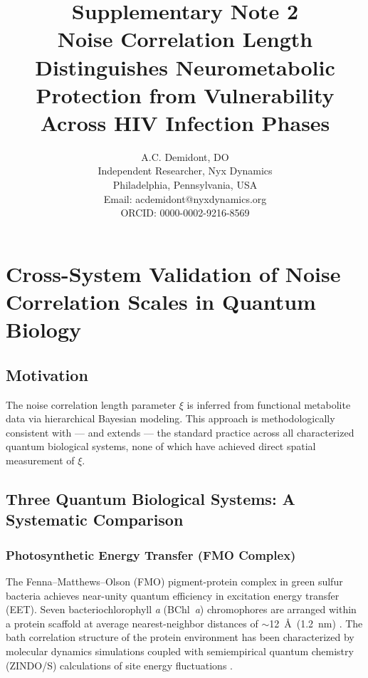 \documentclass[11pt]{article}
\title{\textbf{Supplementary Note 2}\\[0.5em]
\large Noise Correlation Length Distinguishes Neurometabolic Protection from Vulnerability Across HIV Infection Phases}
\author{A.C. Demidont, DO\\
Independent Researcher, Nyx Dynamics\\
Philadelphia, Pennsylvania, USA\\
Email: acdemidont@nyxdynamics.org\\
ORCID: 0000-0002-9216-8569}
\begin{document}
\setcounter{secnumdepth}{3}
\setcounter{tocdepth}{3}

\maketitle
\tableofcontents
\newpage

\section{Cross-System Validation of Noise Correlation Scales in Quantum Biology}
\label{sec:cross_system_validation}

\subsection{Motivation}
The noise correlation length parameter $\xi$ is inferred from functional metabolite data via hierarchical Bayesian modeling. This approach is methodologically consistent with — and extends — the standard practice across all characterized quantum biological systems, none of which have achieved direct spatial measurement of $\xi$.

\subsection{Three Quantum Biological Systems: A Systematic Comparison}

\subsubsection{Photosynthetic Energy Transfer (FMO Complex)}

The Fenna--Matthews--Olson (FMO) pigment-protein complex in green sulfur bacteria achieves near-unity 
quantum efficiency in excitation energy transfer (EET). Seven bacteriochlorophyll \textit{a} (BChl~\textit{a}) 
chromophores are arranged within a protein scaffold at average nearest-neighbor distances of $\sim$12~\AA\ 
(1.2~nm) \cite{Milder2010}. The bath correlation structure of the protein environment has been 
characterized by molecular dynamics simulations coupled with semiempirical quantum chemistry (ZINDO/S) 
calculations of site energy fluctuations \cite{Olbrich2011}.
\end{document}
